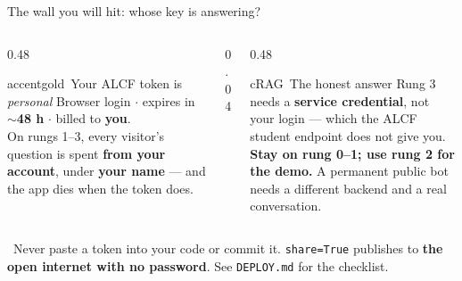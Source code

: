 \begin{frame}{The wall you will hit: whose key is answering?}
  \begin{columns}[t, totalwidth=\textwidth]
    \begin{column}{0.48\textwidth}
      \begin{featbox}{accentgold}{\faKey\ Your ALCF token is \emph{personal}}
        \scriptsize
        Browser login $\cdot$ expires in \textbf{$\sim$48 h} $\cdot$ billed to \textbf{you}.
        \\[3pt]On rungs 1--3, every visitor's question is spent \textbf{from your account},
        under \textbf{your name} --- and the app dies when the token does.
      \end{featbox}
    \end{column}
    \begin{column}{0.04\textwidth}\end{column}
    \begin{column}{0.48\textwidth}
      \begin{featbox}{cRAG}{\faLock\ The honest answer}
        \scriptsize
        Rung 3 needs a \textbf{service credential}, not your login --- which the ALCF
        student endpoint does not give you.
        \\[3pt]\textbf{Stay on rung 0--1; use rung 2 for the demo.} A permanent public
        bot needs a different backend and a real conversation.
      \end{featbox}
    \end{column}
  \end{columns}
  \vspace{8pt}
  \begin{calloutbox}[labnavy]
    \small\faExclamationTriangle\ Never paste a token into your code or commit it.
    \texttt{share=True} publishes to \textbf{the open internet with no password}. See
    \texttt{DEPLOY.md} for the checklist.
  \end{calloutbox}
\end{frame}

